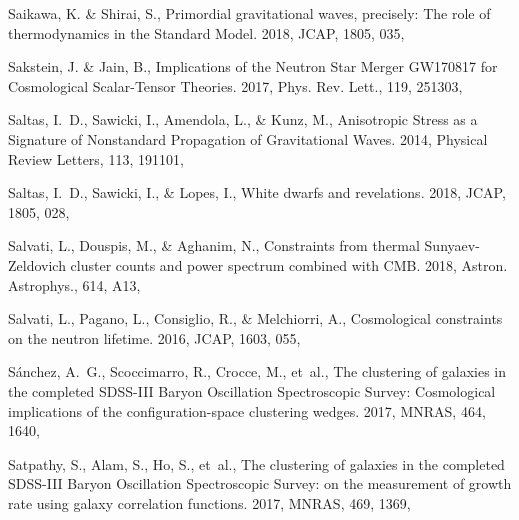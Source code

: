 \documentclass[longauth,traditabstract]{aa}
\def\mnras{{MNRAS}}
\def\jcap{{JCAP}}
\begin{document}
\begin{thebibliography}{379}
Saikawa, K. \& Shirai, S., {Primordial gravitational waves, precisely: The role
  of thermodynamics in the Standard Model}. 2018, JCAP, 1805, 035,

Sakstein, J. \& Jain, B., {Implications of the Neutron Star Merger GW170817 for
  Cosmological Scalar-Tensor Theories}. 2017, Phys. Rev. Lett., 119, 251303,

{Saltas}, I.~D., {Sawicki}, I., {Amendola}, L., \& {Kunz}, M., {Anisotropic
  Stress as a Signature of Nonstandard Propagation of Gravitational Waves}.
  2014, Physical Review Letters, 113, 191101, 

Saltas, I.~D., Sawicki, I., \& Lopes, I., {White dwarfs and revelations}. 2018,
  JCAP, 1805, 028, 

Salvati, L., Douspis, M., \& Aghanim, N., {Constraints from thermal
  Sunyaev-Zeldovich cluster counts and power spectrum combined with CMB}. 2018,
  Astron. Astrophys., 614, A13, 

Salvati, L., Pagano, L., Consiglio, R., \& Melchiorri, A., {Cosmological
  constraints on the neutron lifetime}. 2016, \jcap, 1603, 055,

{S{\'a}nchez}, A.~G., {Scoccimarro}, R., {Crocce}, M., {et~al.}, {The
  clustering of galaxies in the completed SDSS-III Baryon Oscillation
  Spectroscopic Survey: Cosmological implications of the configuration-space
  clustering wedges}. 2017, \mnras, 464, 1640, 

{Satpathy}, S., {Alam}, S., {Ho}, S., {et~al.}, {The clustering of galaxies in
  the completed SDSS-III Baryon Oscillation Spectroscopic Survey: on the
  measurement of growth rate using galaxy correlation functions}. 2017, \mnras,
  469, 1369, 


\end{thebibliography}
\end{document}
